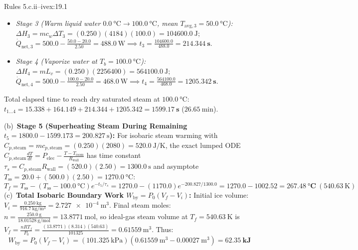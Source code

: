 \begin{workedexample}{Rules 5.c.ii--iv}{ex:19.1}
\begin{itemize}
  \item \emph{Stage 3 (Warm liquid water $\SI{0.0}{\celsius} \to \SI{100.0}{\celsius}$, mean $T_{\mathrm{avg},3} = \SI{50.0}{\celsius}$):}
  $\Delta H_3 = m c_w \Delta T_3 = (0.250)(4184)(100.0) = \SI{104600.0}{\joule}$; $\dot{Q}_{\mathrm{net},3} = 500.0 - \frac{50.0 - 20.0}{2.50} = \SI{488.0}{\watt} \implies t_3 = \frac{104600.0}{488.0} = \mathbf{\SI{214.344}{\second}}$.
  \item \emph{Stage 4 (Vaporize water at $T_b = \SI{100.0}{\celsius}$):}
  $\Delta H_4 = m L_v = (0.250)(2256400) = \SI{564100.0}{\joule}$; $\dot{Q}_{\mathrm{net},4} = 500.0 - \frac{100.0 - 20.0}{2.50} = \SI{468.0}{\watt} \implies t_4 = \frac{564100.0}{468.0} = \mathbf{\SI{1205.342}{\second}}$.
\end{itemize}
Total elapsed time to reach dry saturated steam at $\SI{100.0}{\celsius}$: $t_{1\dots 4} = 15.338 + 164.149 + 214.344 + 1205.342 = \mathbf{\SI{1599.17}{\second}}$ ($\SI{26.65}{\minute}$).
\par\noindent
(b)~\textbf{Stage 5 (Superheating Steam During Remaining $t_5 = 1800.0 - 1599.173 = \SI{200.827}{\second}$):}
For isobaric steam warming with $C_{p,\mathrm{steam}} = m c_{p,\mathrm{steam}} = (0.250)(2080) = \SI{520.0}{\joule\per\kelvin}$, the exact lumped ODE $C_{p,\mathrm{steam}}\frac{dT}{dt} = P_{\mathrm{elec}} - \frac{T - T_{\mathrm{room}}}{R_{\mathrm{wall}}}$ has time constant $\tau_s = C_{p,\mathrm{steam}}R_{\mathrm{wall}} = (520.0)(2.50) = \SI{1300.0}{\second}$ and asymptote $T_{\mathrm{ss}} = 20.0 + (500.0)(2.50) = \SI{1270.0}{\celsius}$:
$$T_f = T_{\mathrm{ss}} - (T_{\mathrm{ss}} - \SI{100.0}{\celsius})e^{-t_5/\tau_s} = 1270.0 - (1170.0)e^{-200.827/1300.0} = 1270.0 - 1002.52 = \mathbf{\SI{267.48}{\celsius}}\ (\SI{540.63}{\kelvin})$$
(c)~\textbf{Total Isobaric Boundary Work $W_{\mathrm{by}} = P_0(V_f - V_i)$:}
Initial ice volume: $V_i = \frac{\SI{0.250}{\kilogram}}{\SI{916.7}{\kilogram\per\cubic\meter}} = \SI{2.727e-4}{\cubic\meter}$. Final steam moles: $n = \frac{\SI{250.0}{\gram}}{\SI{18.01528}{\gram\per\mole}} = \SI{13.8771}{\mole}$, so ideal-gas steam volume at $T_f = \SI{540.63}{\kelvin}$ is $V_f = \frac{n R T_f}{P_0} = \frac{(13.8771)(8.314)(540.63)}{101325} = \SI{0.61559}{\cubic\meter}$. Thus:
$$W_{\mathrm{by}} = P_0(V_f - V_i) = (\SI{101.325}{\kilo\pascal})(\SI{0.61559}{\cubic\meter} - \SI{0.00027}{\cubic\meter}) = \mathbf{\SI{62.35}{\kilo\joule}}$$
\end{workedexample}

